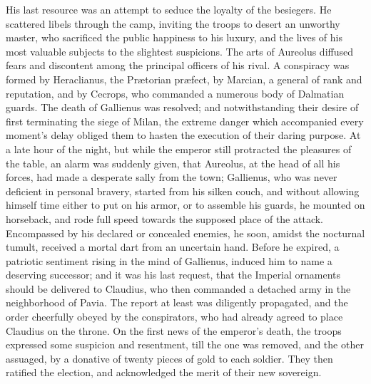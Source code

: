 
His last resource was an attempt to seduce the loyalty of the
besiegers. He scattered libels through the camp, inviting the
troops to desert an unworthy master, who sacrificed the public
happiness to his luxury, and the lives of his most valuable
subjects to the slightest suspicions. The arts of Aureolus
diffused fears and discontent among the principal officers of his
rival. A conspiracy was formed by Heraclianus, the Prætorian
præfect, by Marcian, a general of rank and reputation, and by
Cecrops, who commanded a numerous body of Dalmatian guards. The
death of Gallienus was resolved; and notwithstanding their desire
of first terminating the siege of Milan, the extreme danger which
accompanied every moment’s delay obliged them to hasten the
execution of their daring purpose. At a late hour of the night,
but while the emperor still protracted the pleasures of the
table, an alarm was suddenly given, that Aureolus, at the head of
all his forces, had made a desperate sally from the town;
Gallienus, who was never deficient in personal bravery, started
from his silken couch, and without allowing himself time either
to put on his armor, or to assemble his guards, he mounted on
horseback, and rode full speed towards the supposed place of the
attack. Encompassed by his declared or concealed enemies, he
soon, amidst the nocturnal tumult, received a mortal dart from an
uncertain hand. Before he expired, a patriotic sentiment rising
in the mind of Gallienus, induced him to name a deserving
successor; and it was his last request, that the Imperial
ornaments should be delivered to Claudius, who then commanded a
detached army in the neighborhood of Pavia. The report at least
was diligently propagated, and the order cheerfully obeyed by the
conspirators, who had already agreed to place Claudius on the
throne. On the first news of the emperor’s death, the troops
expressed some suspicion and resentment, till the one was
removed, and the other assuaged, by a donative of twenty pieces
of gold to each soldier. They then ratified the election, and
acknowledged the merit of their new sovereign.\footnotemark[2]

